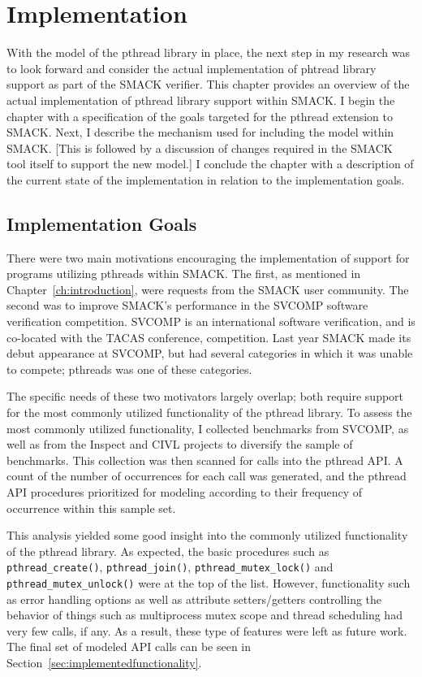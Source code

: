 \chapter{Implementation}\label{ch:implementation}
With the model of the pthread library in place, the next step in my
research was to look forward and consider the actual implementation of
phtread library support as part of the SMACK verifier.  This chapter
provides an overview of the actual implementation of pthread library
support within SMACK.  I begin the chapter with a specification of the
goals targeted for the pthread extension to SMACK.  Next, I describe
the mechanism used for including the model within SMACK.  [This is
followed by a discussion of changes required in the SMACK tool itself
to support the new model.]  I conclude the chapter with a description
of the current state of the implementation in relation to the
implementation goals.

\section{Implementation Goals}\label{sec:implementationgoals}
There were two main motivations encouraging the implementation of
support for programs utilizing pthreads within SMACK.  The first, as
mentioned in Chapter~\ref{ch:introduction}, were requests from the
SMACK user community.  The second was to improve SMACK's performance
in the SVCOMP software verification competition.  SVCOMP is an
international software verification, and is co-located with the TACAS
conference, competition.  Last year SMACK made its debut appearance at
SVCOMP, but had several categories in which it was unable to compete;
pthreads was one of these categories.

The specific needs of these two motivators largely overlap; both
require support for the most commonly utilized functionality of the
pthread library.  To assess the most commonly utilized functionality,
I collected benchmarks from SVCOMP, as well as from the Inspect and
CIVL projects to diversify the sample of benchmarks.  This collection
was then scanned for calls into the pthread API.  A count of the
number of occurrences for each call was generated, and the pthread API
procedures prioritized for modeling according to their frequency of
occurrence within this sample set. 

This analysis yielded some good insight into the commonly utilized
functionality of the pthread library.  As expected, the basic
procedures such as \lstinline[breaklines]|pthread_create()|,
\lstinline[breaklines]|pthread_join()|,
\lstinline[breaklines]|pthread_mutex_lock()| and 
\lstinline[breaklines]|pthread_mutex_unlock()| were at the top of the
list. However, functionality such as error handling options as well as
attribute setters/getters controlling the behavior of things such as
multiprocess mutex scope and thread scheduling had very few calls, if
any.  As a result, these type of features were left as future
work. The final set of modeled API calls can be seen in
Section~\ref{sec:implementedfunctionality}.  

